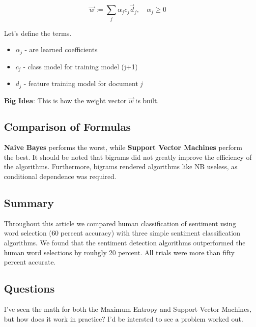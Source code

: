\documentclass{article}
\begin{document}
\[
    \vec{w} := \sum_j \alpha_j c_j \vec{d}_j, \quad \alpha_j \geq 0
\]

Let's define the terms.

\begin{itemize}
    \item{$\alpha_{j}$ - are learned coefficients}
    \item $c_j$ - class model for training model (j+1)
    \item $d_j$ - feature training model for document \textit{j}
\end{itemize}

\textbf{Big Idea}: This is how the weight vector $\vec{w}$ is built.


\subsection{Comparison of Formulas}


\textbf{Naive Bayes} performs the worst, while \textbf{Support Vector Machines} perform the best. It should be noted that bigrams did not greatly improve the efficiency
of the algorithms. Furthermore, bigrams rendered algorithms like NB useless, as conditional dependence was required.

\subsection{Summary}

Throughout this article we compared human classification of sentiment using word selection (60 percent accuracy)
with three simple sentiment classification algorithms. We found that the sentiment detection algorithms outperformed
the human word selections by rouhgly 20 percent. All trials were more than fifty percent accurate.

\subsection{Questions}

I've seen the math for both the Maximum Entropy and Support Vector Machines, but how does it work in practice? I'd
be intersted to see a problem worked out.
\end{document}
